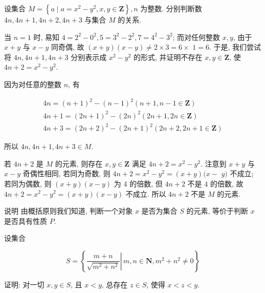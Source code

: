 \begin{example}
	设集合 $M=\left\{a \mid a=x^{2}-y^{2}, x, y \in \mathbf{Z}\right\}, n$ 为整数. 分别判断数 $4 n ,  4 n+1 ,  4 n+2 ,  4 n+3$ 与集合 $M$ 的关系.
\end{example}

\begin{analysis}
	当 $n=1$ 时, 易知 $4=2^{2}-0^{2}, 5=3^{2}-2^{2}, 7=4^{2}-3^{2}$; 而对任何整数 $x ,  y$, 由于 $x+y$ 与 $x-y$ 同奇偶, 故 $(x+y)(x-y) \neq 2 \times 3=6 \times$ $1=6$. 于是, 我们尝试将 $4 n ,  4 n+1 ,  4 n+3$ 分别表示成 $x^{2}-y^{2}$ 的形式, 并证明不存在 $x, y \in \mathbf{Z}$, 使 $4 n+2=x^{2}-y^{2}$.
\end{analysis}

\begin{solution}
	因为对任意的整数 $n$, 有

	\begin{gather*}
		4 n=(n+1)^{2}-(n-1)^{2}(n+1, n-1 \in \mathbf{Z}) \\
		4 n+1=(2 n+1)^{2}-(2 n)^{2}(2 n+1,2 n \in \mathbf{Z}) \\
		4 n+3=(2 n+2)^{2}-(2 n+1)^{2}(2 n+2,2 n+1 \in \mathbf{Z})
	\end{gather*}

	所以 $4 n, 4 n+1,4 n+3 \in M$.

	若 $4 n+2$ 是 $M$ 的元素, 则存在 $x, y \in \mathbf{Z}$ 满足 $4 n+2=x^{2}-y^{2}$. 注意到 $x+y$ 与 $x-y$ 奇偶性相同, 若同为奇数, 则 $4 n+2=x^{2}-y^{2}=(x+y)(x-$ $y)$ 不成立; 若同为偶数, 则 $(x+y)(x-y)$ 为 4 的倍数, 但 $4 n+2$ 不是 4 的倍数, 故 $4 n+2=x^{2}-y^{2}=(x+y)(x-y)$ 不成立. 所以 $4 n+2$ 不是 $M$ 的元素.

	说明 由概括原则我们知道, 判断一个对象 $x$ 是否为集合 $S$ 的元素, 等价于判断 $x$ 是否具有性质 $P$.
\end{solution}

\begin{example}
	设集合

	$$
		S=\left\{\left.\frac{m+n}{\sqrt{m^{2}+n^{2}}} \right\rvert\, m, n \in \mathbf{N}, m^{2}+n^{2} \neq 0\right\}
	$$

	证明: 对一切 $x, y \in S$, 且 $x<y$, 总存在 $z \in S$, 使得 $x<z<y$.
\end{example}

